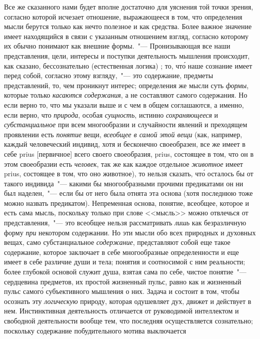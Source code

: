 Все же сказанного нами будет вполне достаточно для
уяснения той точки зрения, согласно которой исчезает
отношение, выражающееся в том, что определения мысли
берутся только как нечто полезное и как средства. Более
важное значение имеет находящийся в связи с указанным
отношением взгляд, согласно которому их обычно понимают
как внешние формы.~"--- Пронизывающая все наши
представления, цели, интересы и поступки деятельность
мышления происходит, как сказано, бессознательно (естественная
логика) ; то, чт\'о наше сознание имеет перед
собой, согласно этому взгляду,~"--- это содержание, предметы
представлений, то, чем проникнут интерес; определения
же мысли суть \emph{формы}, которые только \emph{касаются
содержания}, а не составляют самого содержания. Но если
верно то, что мы указали выше и с чем в общем соглашаются,
а именно, если верно, что \emph{природа}, особая \emph{сущность},
истинно \emph{сохраняющееся} и \emph{субстанциальное} при
всем многообразии и случайности явлений и преходящем
проявлении есть \emph{понятие} вещи, \emph{всеобщее в самой этой
вещи} (как, например, каждый человеческий индивид,
хотя и бесконечно своеобразен, все же имеет в себе prius
[первичное] всего своего своеобразия, prius, состоящее в
том, что он в этом своеобразии есть \emph{человек}, так же как
каждое отдельное \emph{животное} имеет prius, состоящее в том,
что оно животное), то нельзя сказать, чт\'о осталось бы от
такого индивида~"--- какими бы многообразными прочими
предикатами он ни был наделен,~"--- если бы от него была
отнята эта основа (хотя последнюю тоже можно назвать
предикатом). Непременная основа, понятие, всеобщее, которое
и есть сама мысль, поскольку только при слове
<<мысль>> можно отвлечься от представления,~"--- это всеобщее
нельзя рассматривать \emph{лишь} как безразличную форму
\emph{при} некотором содержании. Но эти мысли обо всех природных
и духовных вещах, само субстанциальное \emph{содержание},
представляют собой еще такое содержание, которое
заключает в себе многообразные определенности и
еще имеет в себе различие души и тела; понятия и соотносимой
с ним реальности; более глубокой основой служит
душа, взятая сама по себе, чистое понятие~"--- сердцевина
предметов, их простой жизненный пульс, равно как
и жизненный пульс самог\'о субъективного мышления о
них. Задача и состоит в том, чтобы осознать эту \emph{логическую}
природу, которая одушевляет дух, движет и действует
в нем. Инстинктивная деятельность отличается от
руководимой интеллектом и свободной деятельности
вообще тем, что последняя осуществляется сознательно;
поскольку содержание побудительного мотива выключается
